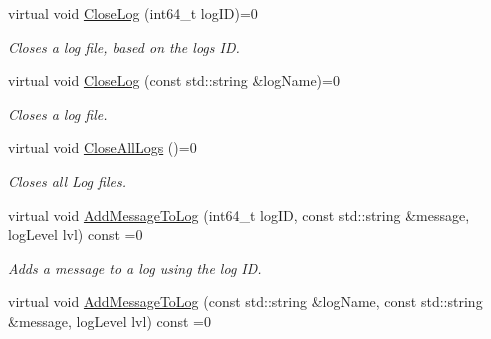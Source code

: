 \begin{DoxyCompactItemize}
\mbox{\label{classLoggerClasses_1_1I__LogHandler_a658c99568d629e22f4c8b69f03c1a96c}} 
virtual void \mbox{\hyperlink{classLoggerClasses_1_1I__LogHandler_a658c99568d629e22f4c8b69f03c1a96c}{Close\+Log}} (int64\+\_\+t log\+ID)=0
\begin{DoxyCompactList}\small\item\em Closes a log file, based on the logs ID. \end{DoxyCompactList}\item 
\mbox{\label{classLoggerClasses_1_1I__LogHandler_a2cba089bf717569c3bccea8ed6013c21}} 
virtual void \mbox{\hyperlink{classLoggerClasses_1_1I__LogHandler_a2cba089bf717569c3bccea8ed6013c21}{Close\+Log}} (const std\+::string \&log\+Name)=0
\begin{DoxyCompactList}\small\item\em Closes a log file. \end{DoxyCompactList}\item 
\mbox{\label{classLoggerClasses_1_1I__LogHandler_a297dc04793c0640700860d36e70bc718}} 
virtual void \mbox{\hyperlink{classLoggerClasses_1_1I__LogHandler_a297dc04793c0640700860d36e70bc718}{Close\+All\+Logs}} ()=0
\begin{DoxyCompactList}\small\item\em Closes all Log files. \end{DoxyCompactList}\item 
\mbox{\label{classLoggerClasses_1_1I__LogHandler_a2e8c845fd0f58376995d5b858c99ac95}} 
virtual void \mbox{\hyperlink{classLoggerClasses_1_1I__LogHandler_a2e8c845fd0f58376995d5b858c99ac95}{Add\+Message\+To\+Log}} (int64\+\_\+t log\+ID, const std\+::string \&message, log\+Level lvl) const =0
\begin{DoxyCompactList}\small\item\em Adds a message to a log using the log ID. \end{DoxyCompactList}\item 
\mbox{\label{classLoggerClasses_1_1I__LogHandler_aa9db5e8d4bcd800663bb4dc08cbdda14}} 
virtual void \mbox{\hyperlink{classLoggerClasses_1_1I__LogHandler_aa9db5e8d4bcd800663bb4dc08cbdda14}{Add\+Message\+To\+Log}} (const std\+::string \&log\+Name, const std\+::string \&message, log\+Level lvl) const =0

\end{DoxyCompactItemize}
